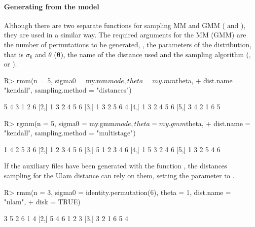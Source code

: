 \documentclass[article,nojss]{jss}
\begin{document}
\paragraph*{Generating from the model}
Although there are two separate functions for sampling MM and GMM ( and ), they are used in a similar way. The required arguments for the MM (GMM) are the number of permutations to be generated, , the parameters of the distribution, that is $\sigma_0$ and $\theta$ ($\boldsymbol\theta$), the name of the distance used and the sampling algorithm (,  or ).
\begin{Schunk}
\begin{Sinput}
R> rmm(n = 5, sigma0 = my.mm$mode, theta = my.mm$theta, 
+     dist.name = "kendall", sampling.method = "distances")
\end{Sinput}
\begin{Soutput}
     [,1] [,2] [,3] [,4] [,5] [,6]
[1,]    5    4    3    1    2    6
[2,]    1    3    2    4    5    6
[3,]    1    3    2    5    6    4
[4,]    1    3    2    4    5    6
[5,]    3    4    2    1    6    5
\end{Soutput}
\begin{Sinput}
R> rgmm(n = 5, sigma0 = my.gmm$mode, theta = my.gmm$theta, 
+     dist.name = "kendall", sampling.method = "multistage")
\end{Sinput}
\begin{Soutput}
     [,1] [,2] [,3] [,4] [,5] [,6]
[1,]    1    4    2    5    3    6
[2,]    1    2    3    4    5    6
[3,]    5    1    2    3    4    6
[4,]    1    5    3    2    4    6
[5,]    1    3    2    5    4    6
\end{Soutput}
\end{Schunk}

If the auxiliary files have been generated with the function , the distances sampling for the Ulam distance can rely on them, setting the  parameter to .

\begin{Schunk}
\begin{Sinput}
R> rmm(n = 3, sigma0 = identity.permutation(6), theta = 1, dist.name = "ulam", 
+     disk = TRUE)
\end{Sinput}
\begin{Soutput}
     [,1] [,2] [,3] [,4] [,5] [,6]
[1,]    3    5    2    6    1    4
[2,]    5    4    6    1    2    3
[3,]    3    2    1    6    5    4
\end{Soutput}
\end{Schunk}
\end{document}
